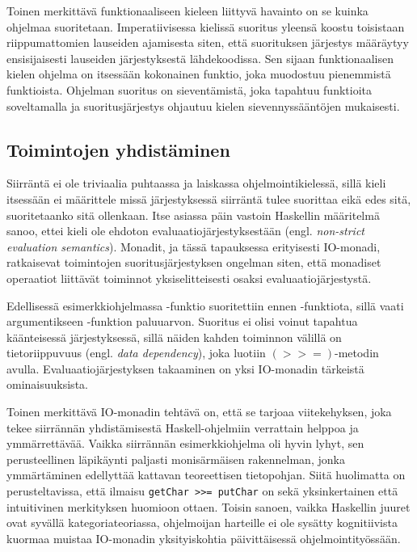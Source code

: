 \documentclass[finnish]{tktltiki2}
\begin{document}
Toinen merkittävä funktionaaliseen kieleen liittyvä havainto on se kuinka ohjelmaa suoritetaan.
Imperatiivisessa kielissä suoritus yleensä koostu toisistaan riippumattomien lauseiden ajamisesta
siten, että suorituksen järjestys määräytyy ensisijaisesti lauseiden järjestyksestä lähdekoodissa.
Sen sijaan funktionaalisen kielen ohjelma on itsessään kokonainen funktio, joka muodostuu
pienemmistä funktioista. Ohjelman suoritus on sieventämistä, joka tapahtuu funktioita soveltamalla
ja suoritusjärjestys ohjautuu kielen sievennyssääntöjen mukaisesti.



\subsection{Toimintojen yhdistäminen}

Siirräntä ei ole triviaalia puhtaassa ja laiskassa ohjelmointikielessä, sillä kieli itsessään ei
määrittele missä järjestyksessä siirräntä tulee suorittaa eikä edes sitä, suoritetaanko sitä
ollenkaan. Itse asiassa päin vastoin Haskellin määritelmä sanoo, ettei kieli ole ehdoton
evaluaatiojärjestyksestään (engl. \emph{non-strict evaluation semantics}). Monadit, ja tässä
tapauksessa erityisesti IO-monadi, ratkaisevat toimintojen suoritusjärjestyksen ongelman siten, että
monadiset operaatiot liittävät toiminnot yksiselitteisesti osaksi evaluaatiojärjestystä.

Edellisessä esimerkkiohjelmassa -funktio suoritettiin ennen -funktiota,
sillä  vaati argumentikseen -funktion paluuarvon. Suoritus ei olisi
voinut tapahtua käänteisessä järjestyksessä, sillä näiden kahden toiminnon välillä on
tietoriippuvuus (engl. \emph{data dependency}), joka luotiin $(>>=)$-metodin avulla.
Evaluaatiojärjestyksen takaaminen on yksi IO-monadin tärkeistä ominaisuuksista.

Toinen merkittävä IO-monadin tehtävä on, että se tarjoaa viitekehyksen, joka tekee siirrännän
yhdistämisestä Haskell-ohjelmiin verrattain helppoa ja ymmärrettävää. Vaikka siirrännän
esimerkkiohjelma oli hyvin lyhyt, sen perusteellinen läpikäynti paljasti monisärmäisen rakennelman,
jonka ymmärtäminen edellyttää kattavan teoreettisen tietopohjan. Siitä huolimatta on
perusteltavissa, että ilmaisu \verb|getChar >>= putChar| on sekä yksinkertainen että intuitivinen
merkityksen huomioon ottaen. Toisin sanoen, vaikka Haskellin juuret ovat syvällä kategoriateoriassa,
ohjelmoijan harteille ei ole sysätty kognitiivista kuormaa muistaa IO-monadin yksityiskohtia
päivittäisessä ohjelmointityössään.
\end{document}
